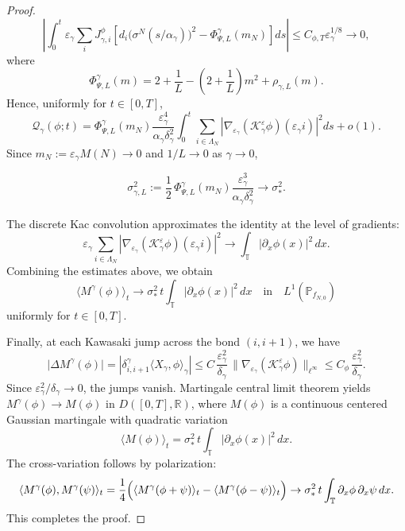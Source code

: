 \documentclass{article}
\begin{document}
\begin{proof}
\begin{equation}
\left| \int_0^t \varepsilon_\gamma\sum_i
J_{\gamma,i}^{\phi} \left[ d_i\bigl(\sigma^N(s/\alpha_\gamma)\bigr)^2 - \Phi_{\Psi,L}^{\gamma}(m_N)
\right]ds \right| \le C_{\phi,T} \varepsilon^{1/8}_{\gamma} \to 0,
\end{equation}
where
\[
\Phi_{\Psi,L}^{\gamma}(m)
= 2+\frac1L - \left( 2+\frac1L \right)m^2+ \rho_{\gamma,L}(m).
\]
Hence, uniformly for \(t\in[0,T]\),
\[
\mathcal Q_\gamma(\phi;t)
= \Phi_{\Psi,L}^{\gamma}(m_N)\frac{\varepsilon_\gamma^4}{\alpha_\gamma\delta_\gamma^2}
\int_0^t
\sum_{i\in\Lambda_N}
\left|
\nabla_{\varepsilon_\gamma}
(\mathcal K_\gamma^\varepsilon\phi)(\varepsilon_\gamma i)
\right|^2ds
+o(1).
\]
Since \(m_N := \varepsilon_{\gamma} M(N) \to 0\) and $1/L \to 0$ as $\gamma \to 0$, 

\[
\sigma_{\gamma,L}^2
:=
\frac12\,\Phi_{\Psi,L}^{\gamma}(m_N)
\frac{\varepsilon_\gamma^3}{\alpha_\gamma\delta_\gamma^2}
\longrightarrow \sigma_*^2 .
\]

The discrete Kac convolution
approximates the identity at the level of gradients:
\[
\varepsilon_\gamma\sum_{i\in\Lambda_N}
\left|
\nabla_{\varepsilon_\gamma}
(\mathcal K_\gamma^\varepsilon\phi)(\varepsilon_\gamma i)
\right|^2
\longrightarrow
\int_{\mathbb T}|\partial_x\phi(x)|^2\,dx .
\]
Combining the estimates above, we obtain
\[
\langle M^\gamma(\phi)\rangle_t
\rightarrow
 \sigma_*^2\,t\int_{\mathbb T}|\partial_x\phi(x)|^2\,dx \quad \text{in} \quad L^1(\mathbb P_{f_{N,0}})
\]
uniformly for \(t\in[0,T]\).

Finally, at each Kawasaki jump across the bond \((i,i+1)\), we have
\begin{equation}
    \bigl|\Delta M^\gamma(\phi)\bigr|
=
\left|
\delta_{i,i+1}^\gamma\langle X_\gamma,\phi\rangle_\gamma
\right|
\le
C\,\frac{\varepsilon_\gamma^2}{\delta_\gamma}\,
\|\nabla_{\varepsilon_\gamma}(\mathcal K_\gamma^\varepsilon\phi)\|_{\ell^\infty}
\le
C_\phi\,\frac{\varepsilon_\gamma^2}{\delta_\gamma}.
\end{equation}
Since \(\varepsilon_\gamma^2/\delta_\gamma\to0\), the jumps vanish.
Martingale central limit theorem yields
\(
M^\gamma(\phi)\rightarrow M(\phi)
\)
in \(D([0,T],\mathbb R)\), where \(M(\phi)\) is a continuous centered Gaussian martingale with quadratic variation
\[
\langle M(\phi)\rangle_t =  \sigma_*^2\,t\int_{\mathbb T}|\partial_x\phi(x)|^2\,dx.
\]
The cross-variation follows by polarization:
\[
\langle M^\gamma(\phi),M^\gamma(\psi)\rangle_t
=
\frac14\Bigl(
\langle M^\gamma(\phi+\psi)\rangle_t
-
\langle M^\gamma(\phi-\psi)\rangle_t
\Bigr) \rightarrow
 \sigma_*^2\,t\int_{\mathbb T}\partial_x\phi\,\partial_x\psi\,dx.
\]
This completes the proof.
\end{proof}
\end{document}
